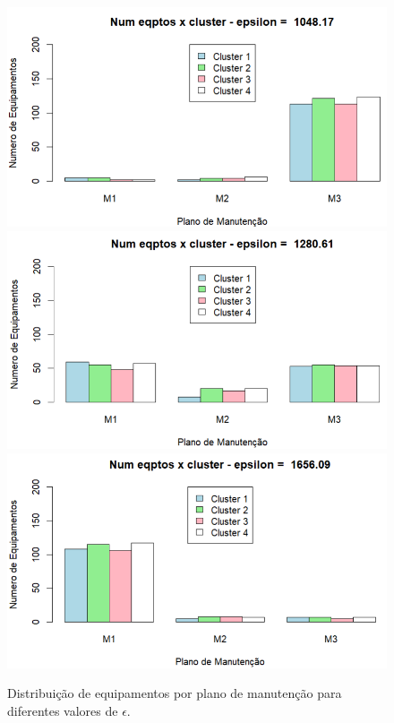 \documentclass[conference]{IEEEtran}
\begin{document}
\begin{figure}[htbp]
    \centering
    \includegraphics[width=\columnwidth,trim=1 1 1 1,clip]{../images/epsilon-pequeno.png}
    \includegraphics[width=\columnwidth,trim=1 1 1 1,clip]{../images/epsilon-medio.png}
    \includegraphics[width=\columnwidth,trim=1 1 1 1,clip]{../images/epsilon-grande.png}
    \caption{\label{fig:results-per_epsilon}
	Distribuição de equipamentos por plano de manutenção para diferentes valores de $\epsilon$.}
\end{figure}
\end{document}

